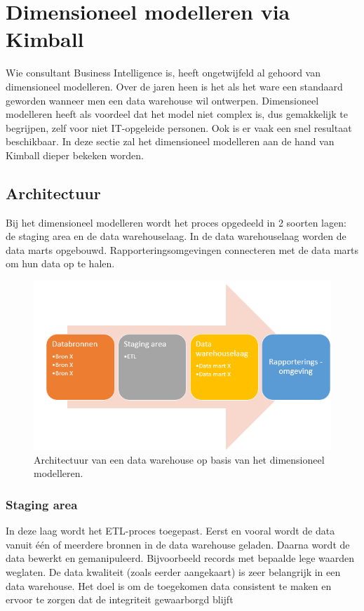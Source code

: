 \pagebreak

\section{Dimensioneel modelleren via Kimball}
Wie consultant Business Intelligence is, heeft ongetwijfeld al gehoord van dimensioneel modelleren. Over de jaren heen is het als het ware een standaard geworden wanneer men een data warehouse wil ontwerpen. Dimensioneel modelleren heeft als voordeel dat het model niet complex is, dus gemakkelijk te begrijpen, zelf voor niet IT-opgeleide personen. Ook is er vaak een snel resultaat beschikbaar. In deze sectie zal het dimensioneel modelleren aan de hand van Kimball dieper bekeken worden. 


\subsection{Architectuur}
Bij het dimensioneel modelleren wordt het proces opgedeeld in 2 soorten lagen: de staging area en de data warehouselaag. In de data warehouselaag worden de data marts opgebouwd. Rapporteringsomgevingen connecteren met de data marts om hun data op te halen.

\begin{figure}[h]
	\centering
	\includegraphics[scale=0.8]{../images/dimmodel.PNG}
	\caption{Architectuur van een data warehouse op basis van het dimensioneel modelleren.}
	\label{fig:dimmodel}
\end{figure}

\subsubsection{Staging area}
\label{sec:stagingarea}
In deze laag wordt het ETL-proces toegepast. Eerst en vooral wordt de data vanuit één of meerdere bronnen in de data warehouse geladen. Daarna wordt de data bewerkt en gemanipuleerd. Bijvoorbeeld records met bepaalde lege waarden weglaten. De data kwaliteit (zoals eerder aangekaart) is zeer belangrijk in een data warehouse. Het doel is om de toegekomen data consistent te maken en ervoor te zorgen dat de integriteit gewaarborgd blijft ~\autocite{Kimball2013}

